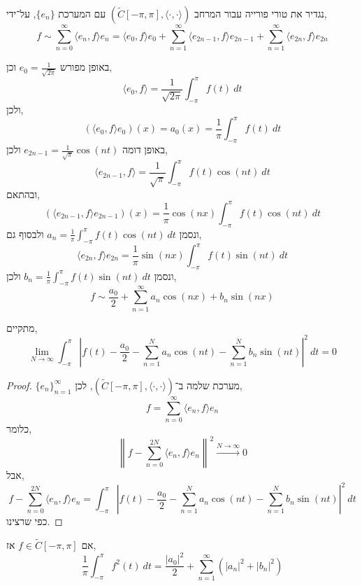 \begin{definition}
	נגדיר את טורי פורייה עבור המרחב $(\tilde{C}[-\pi, \pi], \langle \cdot, \cdot \rangle)$ עם המערכת ${\{ e_n \}}$, על־ידי,
	\[
		f
		\sim \sum_{n = 0}^\infty \langle e_n, f \rangle e_n
		= \langle e_0, f \rangle e_0 + \sum_{n = 1}^\infty \langle e_{2n - 1}, f \rangle e_{2n - 1} + \sum_{n = 1}^\infty \langle e_{2n}, f \rangle e_{2n}
	\]
\end{definition}
\begin{remark}
	באופן מפורש $e_0 = \frac{1}{\sqrt{2 \pi}}$ וכן,
	\[
		\langle e_0, f \rangle = \frac{1}{\sqrt{2 \pi}} \int_{-\pi}^{\pi} f(t)\ dt
	\]
	ולכן,
	\[
		(\langle e_0, f \rangle e_0)(x)
		= a_0(x)
		= \frac{1}{\pi} \int_{-\pi}^{\pi} f(t)\ dt
	\]
	באופן דומה $e_{2n - 1} = \frac{1}{\sqrt{\pi}} \cos(nt)$ ולכן,
	\[
		\langle e_{2n - 1}, f \rangle
		= \frac{1}{\sqrt{\pi}} \int_{-\pi}^{\pi} f(t) \cos(nt)\ dt
	\]
	ובהתאם,
	\[
		(\langle e_{2n - 1}, f \rangle e_{2n - 1})(x)
		= \frac{1}{\pi} \cos(nx) \int_{-\pi}^{\pi} f(t) \cos(nt)\ dt
	\]
	ונסמן $a_n = \frac{1}{\pi} \int_{-\pi}^{\pi} f(t) \cos(nt)\ dt$
	ולבסוף גם,
	\[
		\langle e_{2n}, f \rangle e_{2n}
		= \frac{1}{\pi} \sin(nx) \int_{-\pi}^{\pi} f(t) \sin(nt)\ dt
	\]
	ונסמן $b_n = \frac{1}{\pi} \int_{-\pi}^{\pi} f(t) \sin(nt)\ dt$
	ולכן,
	\[
		f \sim \frac{a_0}{2} + \sum_{n = 1}^\infty a_n \cos(nx) + b_n \sin(nx)
	\]
\end{remark}
\begin{conclusion}
	מתקיים,
	\[
		\lim_{N \to \infty} 
		\int_{-\pi}^{\pi} {\left\lvert f(t) - \frac{a_0}{2} - \sum_{n = 1}^N a_n \cos(nt) - \sum_{n = 1}^N b_n \sin(nt) \right\rvert}^2\ dt
		= 0
	\]
\end{conclusion}
\begin{proof}
	${\{ e_n \}}_{n = 1}^\infty$ מערכת שלמה ב־$(\tilde{C}[-\pi, \pi], \langle \cdot, \cdot \rangle)$,
	לכן,
	\[
		f = \sum_{n = 0}^\infty \langle e_n, f \rangle e_n
	\]
	כלומר,
	\[
		{\left\lVert f - \sum_{n = 0}^{2N} \langle e_n, f \rangle e_n \right\rVert}^2
		\xrightarrow{N \to \infty} 0
	\]
	אבל,
	\[
		f - \sum_{n = 0}^{2N} \langle e_n, f \rangle e_n
		= \int_{-\pi}^{\pi} {\left\lvert f(t) - \frac{a_0}{2} - \sum_{n = 1}^N a_n \cos(nt) - \sum_{n = 1}^N b_n \sin(nt) \right\rvert}^2\ dt
	\]
	כפי שרצינו.
\end{proof}
\begin{conclusion}
	אם $f \in \tilde{C}[-\pi, \pi]$ אז,
	\[
		\frac{1}{\pi} \int_{-\pi}^{\pi} f^2(t)\ dt
		= \frac{{|a_0|}^2}{2} + \sum_{n = 1}^\infty ({| a_n |}^2 + {| b_n |}^2)
	\]
\end{conclusion}
